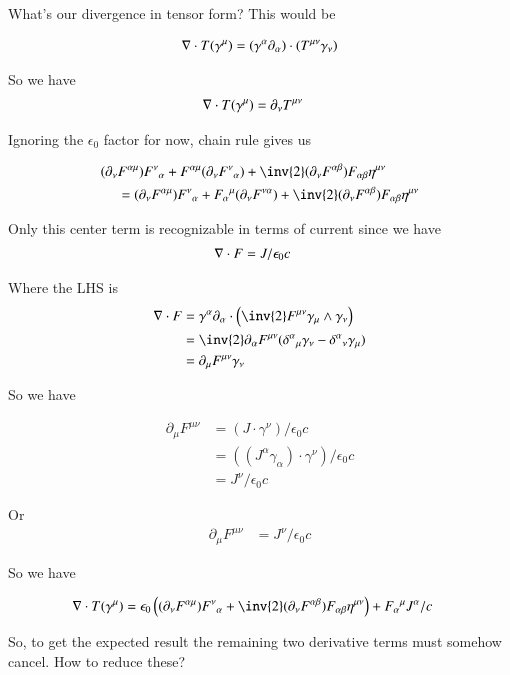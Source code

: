 \documentclass{article}
\begin{document}
What's our divergence in tensor form?  This would be

\begin{align*}
\nabla \cdot T(\gamma^\mu)
&= (\gamma^\alpha \partial_\alpha ) \cdot (T^{\mu\nu} \gamma_\nu) \\
\end{align*}

So we have
\begin{align}
\nabla \cdot T(\gamma^\mu)
&= \partial_\nu T^{\mu\nu}
\end{align}

Ignoring the $\epsilon_0$ factor for now, chain rule gives us

\begin{align*}
(\partial_\nu &F^{\alpha\mu}) {F^{\nu}}_{\alpha} + 
F^{\alpha\mu} (\partial_\nu {F^{\nu}}_{\alpha}) + 
\inv{2} (\partial_\nu F^{\alpha\beta}) F_{\alpha\beta} \eta^{\mu\nu} \\
&=
(\partial_\nu F^{\alpha\mu}) {F^{\nu}}_{\alpha} + 
{F_{\alpha}}^{\mu} 
(\partial_\nu F^{\nu\alpha}) + 
\inv{2} (\partial_\nu F^{\alpha\beta}) F_{\alpha\beta} \eta^{\mu\nu} 
\end{align*}

Only this center term is recognizable in terms of current since we
have
\begin{align*}
\nabla \cdot F &= J/\epsilon_0 c
\end{align*}

Where the LHS is
\begin{align*}
\grad \cdot F 
&= \gamma^\alpha \partial_\alpha \cdot \left( \inv{2} F^{\mu\nu} \gamma_\mu \wedge \gamma_\nu \right) \\
&= \inv{2} \partial_\alpha F^{\mu\nu} ( {\delta^\alpha}_\mu \gamma_\nu -{\delta^\alpha}_\nu \gamma_\mu ) \\
&= \partial_\mu F^{\mu\nu} \gamma_\nu
\end{align*}

So we have

\begin{align*}
\partial_\mu F^{\mu\nu} 
&= (J \cdot \gamma^\nu)/\epsilon_0 c \\
&= ((J^\alpha \gamma_\alpha) \cdot \gamma^\nu)/\epsilon_0 c \\
&= J^\nu/\epsilon_0 c
\end{align*}

Or
\begin{align}
\partial_\mu F^{\mu\nu} &= J^\nu/\epsilon_0 c
\end{align}

So we have

\begin{align*}
\grad \cdot T(\gamma^\mu) 
&= \epsilon_0\left(
(\partial_\nu F^{\alpha\mu}) {F^{\nu}}_{\alpha} + 
\inv{2} (\partial_\nu F^{\alpha\beta}) F_{\alpha\beta} \eta^{\mu\nu} 
\right)
+
{F_{\alpha}}^{\mu} J^\alpha/c
\end{align*}

So, to get the expected result the remaining two derivative terms must somehow cancel.  How to reduce these?



\end{document}
